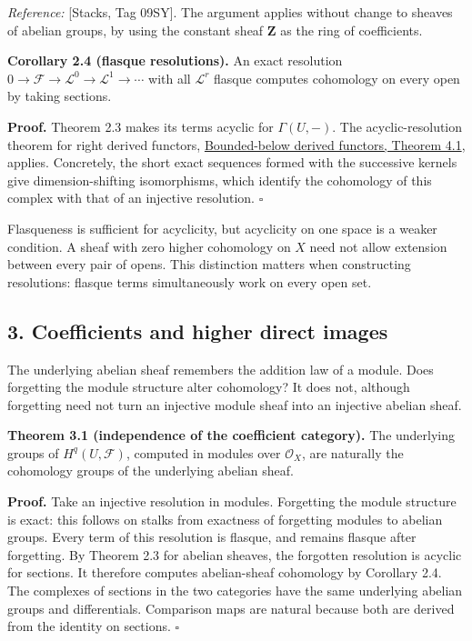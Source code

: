 \documentclass[11pt]{article}
\begin{document}
\emph{Reference:} {[}Stacks, Tag 09SY{]}. The argument applies without
change to sheaves of abelian groups, by using the constant sheaf
\(\mathbf Z\) as the ring of coefficients.

\textbf{Corollary 2.4 (flasque resolutions).} An exact resolution
\(0\to\mathcal F\to\mathcal L^0\to\mathcal L^1\to\cdots\) with all
\(\mathcal L^r\) flasque computes cohomology on every open by taking
sections.

\textbf{Proof.} Theorem 2.3 makes its terms acyclic for \(\Gamma(U,-)\).
The acyclic-resolution theorem for right derived functors,
\href{../derived-categories-and-sheaf-operations/injective-modules-and-bounded-below-derived-functors.html\#4-right-derived-functors-on-bounded-below-complexes}{Bounded-below
derived functors, Theorem 4.1}, applies. Concretely, the short exact
sequences formed with the successive kernels give dimension-shifting
isomorphisms, which identify the cohomology of this complex with that of
an injective resolution. \(\square\)

Flasqueness is sufficient for acyclicity, but acyclicity on one space is
a weaker condition. A sheaf with zero higher cohomology on \(X\) need
not allow extension between every pair of opens. This distinction
matters when constructing resolutions: flasque terms simultaneously work
on every open set.

\subsection{3. Coefficients and higher direct
images}\label{coefficients-and-higher-direct-images}

The underlying abelian sheaf remembers the addition law of a module.
Does forgetting the module structure alter cohomology? It does not,
although forgetting need not turn an injective module sheaf into an
injective abelian sheaf.

\textbf{Theorem 3.1 (independence of the coefficient category).} The
underlying groups of \(H^q(U,\mathcal F)\), computed in modules over
\(\mathcal O_X\), are naturally the cohomology groups of the underlying
abelian sheaf.

\textbf{Proof.} Take an injective resolution in modules. Forgetting the
module structure is exact: this follows on stalks from exactness of
forgetting modules to abelian groups. Every term of this resolution is
flasque, and remains flasque after forgetting. By Theorem 2.3 for
abelian sheaves, the forgotten resolution is acyclic for sections. It
therefore computes abelian-sheaf cohomology by Corollary 2.4. The
complexes of sections in the two categories have the same underlying
abelian groups and differentials. Comparison maps are natural because
both are derived from the identity on sections. \(\square\)
\end{document}
